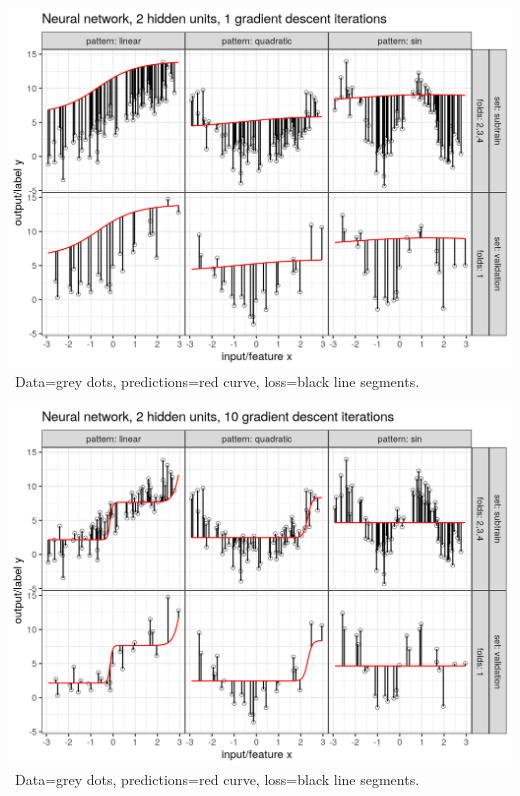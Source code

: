
\begin{frame}
  \includegraphics[width=\textwidth]{figure-overfitting-pred-units=2-maxit=1.png}
\
Data=grey dots, predictions=red curve, loss=black line segments.
\end{frame}


\begin{frame}
  \includegraphics[width=\textwidth]{figure-overfitting-pred-units=2-maxit=10.png}
\
Data=grey dots, predictions=red curve, loss=black line segments.
\end{frame}


